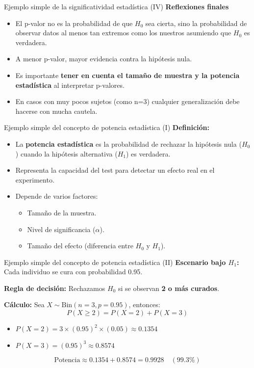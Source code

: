 ﻿\documentclass{beamer}
\begin{document}
\begin{frame}{Ejemplo simple de la significatividad estadística (IV)}
\textbf{Reflexiones finales}
\begin{itemize}
    \item El p-valor no es la probabilidad de que $H_0$ sea cierta, sino la probabilidad de observar datos al menos tan extremos como los nuestros asumiendo que $H_0$ es verdadera.
    \item A menor p-valor, mayor evidencia contra la hipótesis nula.
    \item Es importante \textbf{tener en cuenta el tamaño de muestra y la potencia estadística} al interpretar p-valores.
    \item En casos con muy pocos sujetos (como n=3) cualquier generalización debe hacerse con mucha cautela.
\end{itemize}
\end{frame}



\begin{frame}{Ejemplo simple del concepto de potencia estadística (I)}
\textbf{Definición:}
\begin{itemize}
    \item La \textbf{potencia estadística} es la probabilidad de rechazar la hipótesis nula ($H_0$) cuando la hipótesis alternativa ($H_1$) es verdadera.
    \item Representa la capacidad del test para detectar un efecto real en el experimento.
    \item Depende de varios factores:
    \begin{itemize}
        \item Tamaño de la muestra.
        \item Nivel de significancia ($\alpha$).
        \item Tamaño del efecto (diferencia entre $H_0$ y $H_1$).
    \end{itemize}
\end{itemize}
\end{frame}

\begin{frame}{Ejemplo simple del concepto de potencia estadística (II)}
\textbf{Escenario bajo $H_1$:} Cada individuo se cura con probabilidad 0.95.

\vspace{0.3cm}
\textbf{Regla de decisión:} Rechazamos $H_0$ si se observan \textbf{2 o más curados}.

\vspace{0.3cm}
\textbf{Cálculo:} Sea $X \sim \text{Bin}(n=3, p=0.95)$, entonces:
\[
P(X \geq 2) = P(X=2) + P(X=3)
\]
\begin{itemize}
    \item $P(X=2)= 3\times (0.95)^2 \times (0.05) \approx 0.1354$
    \item $P(X=3)= (0.95)^3 \approx 0.8574$
\end{itemize}
\[
\text{Potencia} \approx 0.1354 + 0.8574 = 0.9928 \quad (99.3\%)
\]
\end{frame}
\end{document}
